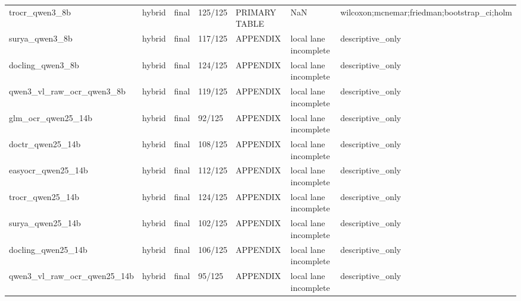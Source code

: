 \begin{tabular}{lllllll}
trocr\_qwen3\_8b & hybrid & final & 125/125 & PRIMARY TABLE & NaN & wilcoxon;mcnemar;friedman;bootstrap\_ci;holm \\
surya\_qwen3\_8b & hybrid & final & 117/125 & APPENDIX & local lane incomplete & descriptive\_only \\
docling\_qwen3\_8b & hybrid & final & 124/125 & APPENDIX & local lane incomplete & descriptive\_only \\
qwen3\_vl\_raw\_ocr\_qwen3\_8b & hybrid & final & 119/125 & APPENDIX & local lane incomplete & descriptive\_only \\
glm\_ocr\_qwen25\_14b & hybrid & final & 92/125 & APPENDIX & local lane incomplete & descriptive\_only \\
doctr\_qwen25\_14b & hybrid & final & 108/125 & APPENDIX & local lane incomplete & descriptive\_only \\
easyocr\_qwen25\_14b & hybrid & final & 112/125 & APPENDIX & local lane incomplete & descriptive\_only \\
trocr\_qwen25\_14b & hybrid & final & 124/125 & APPENDIX & local lane incomplete & descriptive\_only \\
surya\_qwen25\_14b & hybrid & final & 102/125 & APPENDIX & local lane incomplete & descriptive\_only \\
docling\_qwen25\_14b & hybrid & final & 106/125 & APPENDIX & local lane incomplete & descriptive\_only \\
qwen3\_vl\_raw\_ocr\_qwen25\_14b & hybrid & final & 95/125 & APPENDIX & local lane incomplete & descriptive\_only \\
\bottomrule
\end{tabular}
